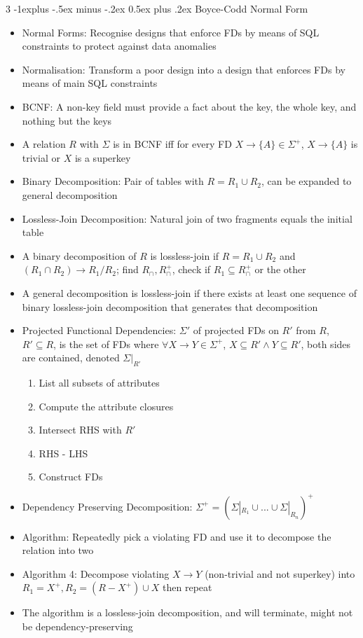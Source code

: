 \documentclass[10pt, landscape]{article}
\makeatletter
\renewcommand{\section}{\@startsection{section}{1}{0mm}%
                                {-1ex plus -.5ex minus -.2ex}%
                                {0.5ex plus .2ex}%
                                {\normalfont\large\bfseries}}
\renewcommand{\section}{\@startsection{section}{2}{0mm}%
                                {-1explus -.5ex minus -.2ex}%
                                {0.5ex plus .2ex}%
                                {\normalfont\normalsize\bfseries}}
\makeatother
\begin{document}
\begin{multicols*}{3}
\section{Boyce-Codd Normal Form}
\begin{itemize}
    \item Normal Forms: Recognise designs that enforce FDs by means of SQL constraints to protect against data anomalies
    \item Normalisation: Transform a poor design into a design that enforces FDs by means of main SQL constraints
    \item BCNF: A non-key field must provide a fact about the key, the whole key, and nothing but the keys
    \item A relation $R$ with $\Sigma$ is in BCNF iff for every FD $X \rightarrow \{A\} \in \Sigma^+$, $X \rightarrow \{A\}$ is trivial or $X$ is a superkey
    \item Binary Decomposition: Pair of tables with $R = R_1 \cup R_2$, can be expanded to general decomposition
    \item Lossless-Join Decomposition: Natural join of two fragments equals the initial table
    \item A binary decomposition of $R$ is lossless-join if $R = R_1 \cup R_2$ and $(R_1 \cap R_2) \rightarrow R_1 / R_2$; find $R_\cap, R_\cap^+$, check if $R_1 \subseteq R_\cap^+$ or the other
    \item A general decomposition is lossless-join if there exists at least one sequence of binary lossless-join decomposition that generates that decomposition
    \item Projected Functional Dependencies: $\Sigma'$ of projected FDs on $R'$ from $R$, $R'\subseteq R$, is the set of FDs where $\forall X \rightarrow Y \in \Sigma^+$, $X \subseteq R' \land Y \subseteq R'$, both sides are contained, denoted $\Sigma|_{R'}$
    \begin{enumerate}
        \item List all subsets of attributes
        \item Compute the attribute closures
        \item Intersect RHS with $R'$
        \item RHS - LHS
        \item Construct FDs
    \end{enumerate}
    \item Dependency Preserving Decomposition: $\Sigma^+=(\Sigma|_{R_1}\cup...\cup \Sigma|_{R_n})^+$
    \item Algorithm: Repeatedly pick a violating FD and use it to decompose the relation into two
    \item Algorithm 4: Decompose violating $X \rightarrow Y$ (non-trivial and not superkey) into $R_1=X^+, R_2=(R-X^+)\cup X$ then repeat
    \item The algorithm is a lossless-join decomposition, and will terminate, might not be dependency-preserving
\end{itemize}


\end{multicols*}
\end{document}
